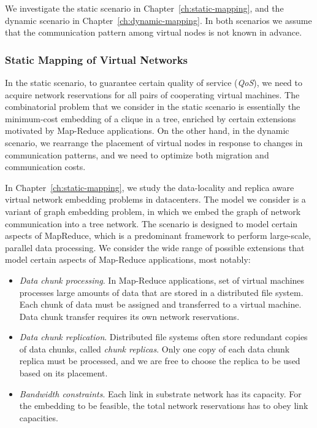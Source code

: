 We investigate the static scenario in Chapter~\ref{ch:static-mapping}, and the dynamic scenario in Chapter~\ref{ch:dynamic-mapping}.
In both scenarios we assume that the communication pattern among virtual nodes is not known in advance.

\subsubsection{Static Mapping of Virtual Networks}
\label{sec:contributions-static-mapping}

In the static scenario, to guarantee certain quality of service (\emph{QoS}), we need to acquire network reservations for all pairs of cooperating virtual machines.
The combinatorial problem that we consider in the static scenario is essentially the minimum-cost embedding of a clique in a tree, enriched by certain extensions motivated by Map-Reduce \cite{mapreduce}  applications.
On the other hand, in the dynamic scenario, we rearrange the placement of virtual nodes in response to changes in communication patterns, and we need to optimize both migration and communication costs.

In Chapter~\ref{ch:static-mapping}, we study the data-locality and replica aware virtual network embedding problems in datacenters.
The model we consider is a variant of graph embedding problem, in which we embed the graph of network communication into a tree network.
The scenario is designed to model certain aspects of MapReduce, which is a predominant framework to perform large-scale, parallel data processing.
We consider the wide range of possible extensions that model certain aspects of Map-Reduce applications, most notably:

\begin{itemize}
\item \emph{Data chunk processing}. In Map-Reduce applications, set of virtual machines processes large amounts of data that are stored in a distributed file system. Each chunk of data must be assigned and transferred to a virtual machine. Data chunk transfer requires its own network reservations.

\item \emph{Data chunk replication}. Distributed file systems often store redundant copies of data chunks, called \emph{chunk replicas}. Only one copy of each data chunk replica must be processed, and we are free to choose the replica to be used based on its placement.

\item \emph{Bandwidth constraints}. Each link in substrate network has its capacity. For the embedding to be feasible, the total network reservations has to obey link capacities.
\end{itemize}



